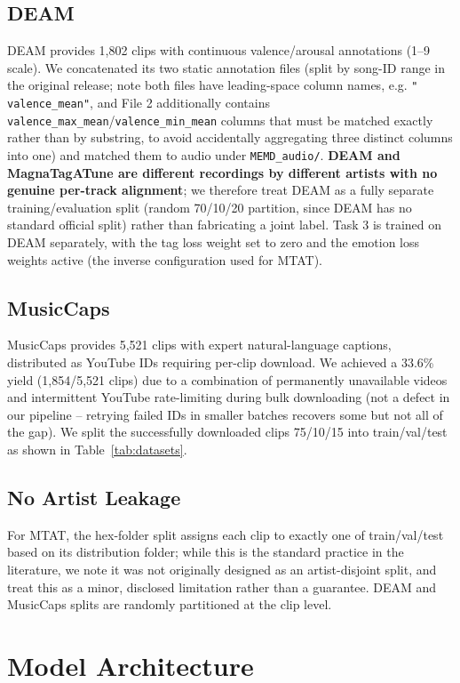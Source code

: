 \documentclass[conference]{IEEEtran}
\begin{document}
\subsection{DEAM}
DEAM provides 1{,}802 clips with continuous valence/arousal annotations
(1--9 scale). We concatenated its two static annotation files (split by
song-ID range in the original release; note both files have
leading-space column names, e.g. \texttt{" valence\_mean"}, and File 2
additionally contains \texttt{valence\_max\_mean}/\texttt{valence\_min\_mean}
columns that must be matched exactly rather than by substring, to avoid
accidentally aggregating three distinct columns into one) and matched
them to audio under \texttt{MEMD\_audio/}. \textbf{DEAM and
MagnaTagATune are different recordings by different artists with no
genuine per-track alignment}; we therefore treat DEAM as a fully
separate training/evaluation split (random 70/10/20 partition, since
DEAM has no standard official split) rather than fabricating a joint
label. Task 3 is trained on DEAM separately, with the tag loss weight
set to zero and the emotion loss weights active (the inverse
configuration used for MTAT).

\subsection{MusicCaps}
MusicCaps provides 5{,}521 clips with expert natural-language captions,
distributed as YouTube IDs requiring per-clip download. We achieved a
33.6\% yield (1{,}854/5{,}521 clips) due to a combination of permanently
unavailable videos and intermittent YouTube rate-limiting during bulk
downloading (not a defect in our pipeline -- retrying failed IDs in
smaller batches recovers some but not all of the gap). We split the
successfully downloaded clips 75/10/15 into train/val/test as shown in
Table~\ref{tab:datasets}.

\subsection{No Artist Leakage}
For MTAT, the hex-folder split assigns each clip to exactly one of
train/val/test based on its distribution folder; while this is the
standard practice in the literature, we note it was not originally
designed as an artist-disjoint split, and treat this as a minor,
disclosed limitation rather than a guarantee. DEAM and MusicCaps splits
are randomly partitioned at the clip level.

\section{Model Architecture}
\end{document}
